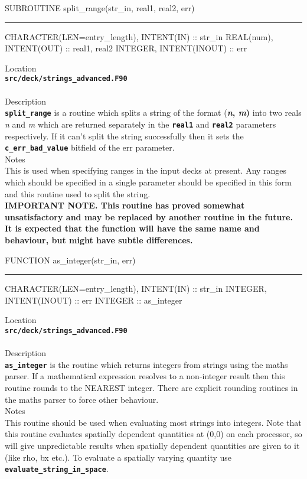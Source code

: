 \documentclass[12pt,a4paper]{article}
\newcommand{\HRule}{\rule[0.3cm]{\linewidth}{0.5mm}}
\newcommand{\inlinecode}[1]{{\color{warwickred} \bf\texttt{#1}}}
\begin{document}
\pagebreak
\begin{codedef}
SUBROUTINE split_range(str_in, real1, real2, err)
\HRule
CHARACTER(LEN=entry_length), INTENT(IN) :: str_in
REAL(num), INTENT(OUT) :: real1, real2
INTEGER, INTENT(INOUT) :: err
\end{codedef}
\vspace{1cm}
{\Large Location\\}
\inlinecode{src/deck/strings\_advanced.F90}\\
\\[0.5cm]
{\Large Description\\}
\inlinecode{split\_range} is a routine which splits a string of the format
{(\bf{\it n}, {\it m})} into two reals {\it n} and {\it m} which are returned
separately in the \inlinecode{real1} and \inlinecode{real2} parameters
respectively.  If it can't split the string successfully then it sets the
\inlinecode{c\_err\_bad\_value} bitfield of the err parameter.
\\[0.5cm]
{\Large Notes\\}
This is used when specifying ranges in the input decks at present. Any
ranges which should be specified in a single parameter should be specified in
this form and this routine used to split the string.\\ {\bf IMPORTANT NOTE. This
routine has proved somewhat unsatisfactory and may be replaced by another
routine in the future. It is expected that the function will have the same name
and behaviour, but might have subtle differences.}

\pagebreak
\begin{codedef}
FUNCTION as_integer(str_in, err)
\HRule
CHARACTER(LEN=entry_length), INTENT(IN) :: str_in
INTEGER, INTENT(INOUT) :: err
INTEGER :: as_integer
\end{codedef}
\vspace{1cm}
{\Large Location\\}
\inlinecode{src/deck/strings\_advanced.F90}\\
\\[0.5cm]
{\Large Description\\}
\inlinecode{as\_integer} is the routine which returns integers from strings
using the maths parser. If a mathematical expression resolves to a non-integer
result then this routine rounds to the NEAREST integer. There are explicit
rounding routines in the maths parser to force other behaviour.
\\[0.5cm]
{\Large Notes\\}
This routine should be used when evaluating most strings into integers. Note
that this routine evaluates spatially dependent quantities at (0,0) on each
processor, so will give unpredictable results when spatially dependent
quantities are given to it (like rho, bx etc.). To evaluate a spatially varying
quantity use \inlinecode{evaluate\_string\_in\_space}.
\end{document}
